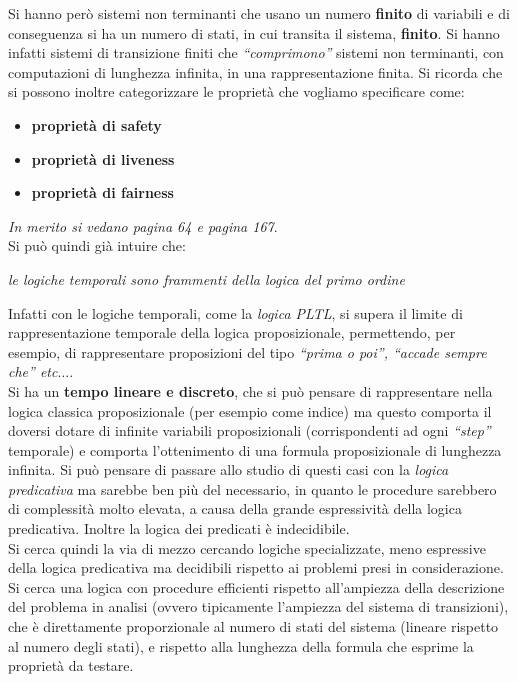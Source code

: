 \documentclass[a4paper,12pt, oneside]{book}
\begin{document}
Si hanno però sistemi non terminanti che usano un numero \textbf{finito} di
variabili e di conseguenza si ha un numero di stati, in cui transita il sistema,
\textbf{finito}. Si hanno infatti sistemi di transizione finiti che
\textit{``comprimono''} sistemi non terminanti, con computazioni di lunghezza
infinita, in una rappresentazione finita.
\newpage
Si ricorda che si possono inoltre categorizzare le proprietà che vogliamo
specificare come: 
\begin{itemize}
  \item \textbf{proprietà di safety}
  \item \textbf{proprietà di liveness}
  \item \textbf{proprietà di fairness}
\end{itemize}
\textit{In merito si vedano pagina 64 e pagina 167}.\\
Si può quindi già intuire che:
\begin{center}
  \textit{le logiche temporali sono frammenti della logica del primo ordine}
\end{center}
Infatti con le logiche temporali, come la \textit{logica PLTL}, si supera il
limite di rappresentazione temporale della logica proposizionale, permettendo,
per esempio, di rappresentare proposizioni del tipo \textit{``prima o poi'',
  ``accade sempre che'' etc$\ldots$}.\\
Si ha un \textbf{tempo lineare e discreto}, che si può pensare di rappresentare
nella logica classica proposizionale (per esempio come indice) ma questo
comporta il doversi dotare di infinite variabili proposizionali (corrispondenti
ad ogni \textit{``step''} temporale) e comporta l'ottenimento di una formula
proposizionale di lunghezza infinita. Si può pensare di passare allo studio di
questi casi con la \textit{logica predicativa} ma sarebbe ben più del
necessario, in quanto le procedure sarebbero di complessità molto elevata, a
causa della grande espressività della logica predicativa. Inoltre la logica dei
predicati è indecidibile. \\
Si cerca quindi la via di mezzo cercando logiche specializzate, meno espressive
della logica predicativa ma decidibili rispetto ai problemi presi in
considerazione. Si cerca una logica con procedure efficienti rispetto
all'ampiezza della descrizione del problema in analisi (ovvero tipicamente
l'ampiezza del sistema di transizioni), che è direttamente proporzionale al
numero di stati del sistema (lineare rispetto al numero degli stati), e rispetto
alla lunghezza della formula che esprime la proprietà da testare.
\newpage
\end{document}
